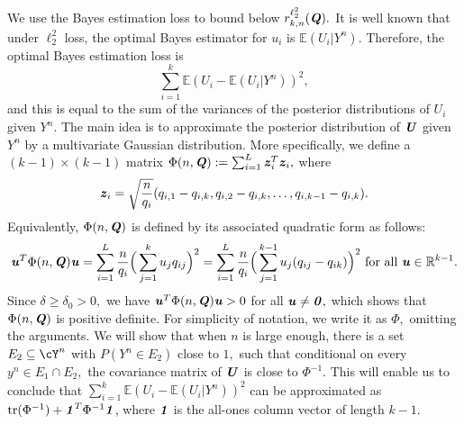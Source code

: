 \documentclass[11pt,onecolumn]{IEEEtran}
\def\mathbi#1{{\textbf{\textit #1}}}
\DeclareMathOperator{\tr}{tr}
\begin{document}
We use the Bayes estimation loss to bound below $r_{k,n}^{\ell_2^2} (\mathbi{Q}).$ It is well known that under $\ell_2^2$ loss, the optimal Bayes estimator for $u_i$ is $\mathbb{E}(U_i|Y^n)$. Therefore, the optimal Bayes estimation loss is 
  \begin{equation}\label{eq:BEL}
\sum_{i=1}^k \mathbb{E}(U_i - \mathbb{E}(U_i|Y^n))^2,
   \end{equation}
      and this is equal to the sum of the variances of the posterior distributions of $U_i$ given $Y^n$.
The main idea is to approximate the posterior distribution of $\mathbi{U}$ given $Y^n$ by a multivariate Gaussian distribution. More specifically, we define a $(k-1) \times (k-1)$ matrix $\Phi(n,\mathbi{Q}):=\sum_{i=1}^L \mathbi{z}_i^T\mathbi{z}_i,$  where
\begin{equation}\label{eq:altPhi}
\mathbi{z}_i=\sqrt{\frac{n}{q_i}}(q_{i,1}-q_{i,k}, q_{i,2}-q_{i,k}, \dots,q_{i,k-1}-q_{i,k}).
\end{equation}
Equivalently, $\Phi(n,\mathbi{Q})$ is defined by its associated quadratic form as follows:
\begin{equation}\label{eq:defPhi}
\mathbi{u}^T \Phi(n,\mathbi{Q}) \mathbi{u} =
\sum_{i=1}^L \frac{n}{q_i} \Big(\sum_{j=1}^k u_j q_{ij} \Big)^2
= \sum_{i=1}^L \frac{n}{q_i} \Big(\sum_{j=1}^{k-1} u_j (q_{ij}-q_{ik}) \Big)^2
\text{~for all~} \mathbi{u}\in\mathbb{R}^{k-1}.
\end{equation}
Since $\delta\ge \delta_0>0,$ we have $\mathbi{u}^T \Phi(n,\mathbi{Q}) \mathbi{u}>0$ for all $\mathbi{u} \neq \mathbi{0},$ 
which shows that $\Phi(n,\mathbi{Q})$ is positive definite. For simplicity of notation, we write it as $\Phi,$ omitting the
arguments. We will show that when $n$ is large enough, there is a set $E_2 \subseteq \cY^n$ with $P(Y^n \in E_2)$ close to $1,$ 
such that conditional on every $y^n \in E_1 \cap E_2,$ the covariance matrix of $\mathbi{U}$ is close to $\Phi^{-1}.$
This will enable us to conclude that $\sum_{i=1}^k \mathbb{E}(U_i - \mathbb{E}(U_i|Y^n))^2$
can be approximated as $\tr(\Phi^{-1}) + \mathbi{1}^T \Phi^{-1} \mathbi{1}$, where $\mathbi{1}$ is the all-ones column vector of length $k-1$.
\end{document}
